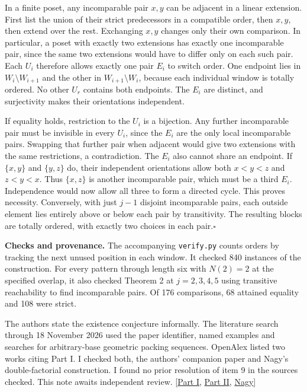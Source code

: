 \documentclass[11pt]{article}
\newcommand{\done}{\hfill\(\square\)}
\begin{document}
In a finite poset, any incomparable pair $x,y$ can be adjacent in a linear extension. First list the union of their strict predecessors in a compatible order, then $x,y$, then extend over the rest. Exchanging $x,y$ changes only their own comparison. In particular, a poset with exactly two extensions has exactly one incomparable pair, since the same two extensions would have to differ only on each such pair. Each $U_i$ therefore allows exactly one pair $E_i$ to switch order. One endpoint lies in $W_i\setminus W_{i+1}$ and the other in $W_{i+1}\setminus W_i$, because each individual window is totally ordered. No other $U_r$ contains both endpoints. The $E_i$ are distinct, and surjectivity makes their orientations independent.

If equality holds, restriction to the $U_i$ is a bijection. Any further incomparable pair must be invisible in every $U_i$, since the $E_i$ are the only local incomparable pairs. Swapping that further pair when adjacent would give two extensions with the same restrictions, a contradiction. The $E_i$ also cannot share an endpoint. If $\{x,y\}$ and $\{y,z\}$ do, their independent orientations allow both $x<y<z$ and $z<y<x$. Thus $\{x,z\}$ is another incomparable pair, which must be a third $E_i$. Independence would now allow all three to form a directed cycle. This proves necessity. Conversely, with just $j-1$ disjoint incomparable pairs, each outside element lies entirely above or below each pair by transitivity. The resulting blocks are totally ordered, with exactly two choices in each pair.\done

\small
\textbf{Checks and provenance.} The accompanying \texttt{verify.py} counts orders by tracking the next unused position in each window. It checked 840 instances of the construction. For every pattern through length six with $N(2)=2$ at the specified overlap, it also checked Theorem 2 at $j=2,3,4,5$ using transitive reachability to find incomparable pairs. Of 176 comparisons, 68 attained equality and 108 were strict.

The authors state the existence conjecture informally. The literature search through 18 November 2026 used the paper identifier, named examples and searches for arbitrary-base geometric packing sequences. OpenAlex listed two works citing Part I. I checked both, the authors' companion paper and Nagy's double-factorial construction. I found no prior resolution of item 9 in the sources checked. This note awaits independent review. [\href{https://arxiv.org/abs/2610.29846}{Part I}, \href{https://arxiv.org/abs/2611.12829}{Part II}, \href{https://arxiv.org/abs/2611.06937}{Nagy}]
\end{document}

